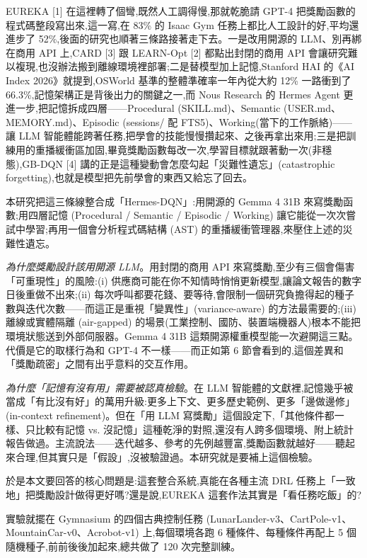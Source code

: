\documentclass[conference,onecolumn,letterpaper,10pt]{IEEEtran}
\begin{document}
EUREKA {[}1{]} 在這裡轉了個彎,既然人工調得慢,那就乾脆請 GPT-4 把獎勵函數的程式碼整段寫出來,這一寫,在 83\% 的 Isaac Gym 任務上都比人工設計的好,平均還進步了 52\%,後面的研究也順著三條路接著走下去。一是改用開源的 LLM、別再綁在商用 API 上,CARD {[}3{]} 跟 LEARN-Opt {[}2{]} 都點出封閉的商用 API 會讓研究難以複現,也沒辦法搬到離線環境裡部署;二是替模型加上記憶,Stanford HAI 的《AI Index 2026》就提到,OSWorld 基準的整體準確率一年內從大約 12\% 一路衝到了 66.3\%,記憶架構正是背後出力的關鍵之一,而 Nous Research 的 Hermes Agent 更進一步,把記憶拆成四層------Procedural (SKILL.md)、Semantic (USER.md、MEMORY.md)、Episodic (sessions/ 配 FTS5)、Working(當下的工作脈絡)------讓 LLM 智能體能跨著任務,把學會的技能慢慢攢起來、之後再拿出來用;三是把訓練用的重播緩衝區加固,畢竟獎勵函數每改一次,學習目標就跟著動一次(非穩態),GB-DQN {[}4{]} 講的正是這種變動會怎麼勾起「災難性遺忘」(catastrophic forgetting),也就是模型把先前學會的東西又給忘了回去。

本研究把這三條線整合成「Hermes-DQN」:用開源的 Gemma 4 31B 來寫獎勵函數;用四層記憶 (Procedural / Semantic / Episodic / Working) 讓它能從一次次嘗試中學習;再用一個會分析程式碼結構 (AST) 的重播緩衝管理器,來壓住上述的災難性遺忘。

\emph{為什麼獎勵設計該用開源 LLM}。用封閉的商用 API 來寫獎勵,至少有三個會傷害「可重現性」的風險:(i) 供應商可能在你不知情時悄悄更新模型,讓論文報告的數字日後重做不出來;(ii) 每次呼叫都要花錢、要等待,會限制一個研究負擔得起的種子數與迭代次數------而這正是重視「變異性」(variance-aware) 的方法最需要的;(iii) 離線或實體隔離 (air-gapped) 的場景(工業控制、國防、裝置端機器人)根本不能把環境狀態送到外部伺服器。Gemma 4 31B 這類開源權重模型能一次避開這三點。代價是它的取樣行為和 GPT-4 不一樣------而正如第 6 節會看到的,這個差異和「獎勵疏密」之間有出乎意料的交互作用。

\emph{為什麼「記憶有沒有用」需要被認真檢驗}。在 LLM 智能體的文獻裡,記憶幾乎被當成「有比沒有好」的萬用升級:更多上下文、更多歷史範例、更多「邊做邊修」(in-context refinement)。但在「用 LLM 寫獎勵」這個設定下,「其他條件都一樣、只比較有記憶 vs. 沒記憶」這種乾淨的對照,還沒有人跨多個環境、附上統計報告做過。主流說法------迭代越多、參考的先例越豐富,獎勵函數就越好------聽起來合理,但其實只是「假設」,沒被驗證過。本研究就是要補上這個檢驗。

於是本文要回答的核心問題是:這套整合系統,真能在各種主流 DRL 任務上「一致地」把獎勵設計做得更好嗎?還是說,EUREKA 這套作法其實是「看任務吃飯」的?

實驗就擺在 Gymnasium 的四個古典控制任務 (LunarLander-v3、CartPole-v1、MountainCar-v0、Acrobot-v1) 上,每個環境各跑 6 種條件、每種條件再配上 5 個隨機種子,前前後後加起來,總共做了 120 次完整訓練。
\end{document}
